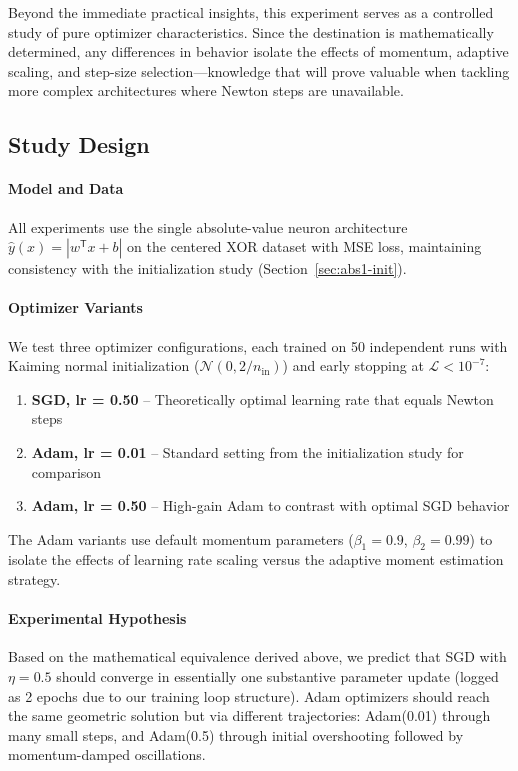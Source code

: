 Beyond the immediate practical insights, this experiment serves as a controlled study of pure optimizer characteristics. Since the destination is mathematically determined, any differences in behavior isolate the effects of momentum, adaptive scaling, and step-size selection—knowledge that will prove valuable when tackling more complex architectures where Newton steps are unavailable.


\subsection*{Study Design}

\paragraph{Model and Data}
All experiments use the single absolute-value neuron architecture $\hat{y}(x) = |w^{\mathsf{T}}x + b|$ on the centered XOR dataset with MSE loss, maintaining consistency with the initialization study (Section~\ref{sec:abs1-init}).

\paragraph{Optimizer Variants}
We test three optimizer configurations, each trained on 50 independent runs with Kaiming normal initialization ($\mathcal{N}(0, 2/n_{\text{in}})$) and early stopping at $\mathcal{L} < 10^{-7}$:

\begin{enumerate}
   \item \textbf{SGD, lr = 0.50} -- Theoretically optimal learning rate that equals Newton steps
   \item \textbf{Adam, lr = 0.01} -- Standard setting from the initialization study for comparison
   \item \textbf{Adam, lr = 0.50} -- High-gain Adam to contrast with optimal SGD behavior
\end{enumerate}

The Adam variants use default momentum parameters ($\beta_1=0.9$, $\beta_2=0.99$) to isolate the effects of learning rate scaling versus the adaptive moment estimation strategy.

\paragraph{Experimental Hypothesis}
Based on the mathematical equivalence derived above, we predict that SGD with $\eta=0.5$ should converge in essentially one substantive parameter update (logged as 2 epochs due to our training loop structure). Adam optimizers should reach the same geometric solution but via different trajectories: Adam(0.01) through many small steps, and Adam(0.5) through initial overshooting followed by momentum-damped oscillations.

